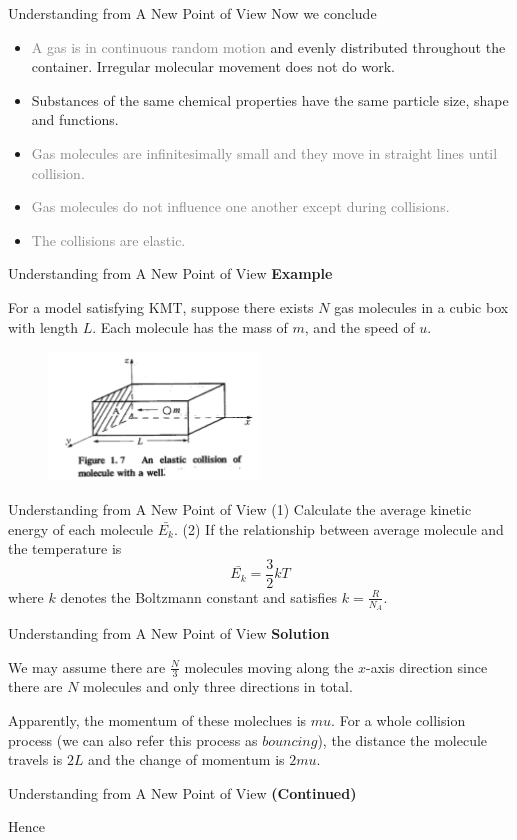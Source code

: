 \documentclass[12pt,compress]{beamer}
\begin{document}
\begin{frame}{Understanding from A New Point of View}
	Now we conclude
	\begin{itemize}
		\item \textcolor{gray}{A gas is in continuous random motion} and
			evenly distributed throughout the container. Irregular molecular 
			movement does not do work.
		\item Substances of the same chemical properties have the same particle size, 
			shape and functions.
		\item \textcolor{gray}{Gas molecules are infinitesimally small and they move in straight 
			lines until collision.}
		\item \textcolor{gray}{Gas molecules do not influence one another except 
			during collisions.}
		\item \textcolor{gray}{The collisions are elastic.}
	\end{itemize}
\end{frame}
\begin{frame}{Understanding from A New Point of View}
	\textbf{Example}
	\par For a model satisfying KMT, suppose there exists $N$ gas molecules in a cubic box with length $L$. Each molecule has the mass of $m$,
	 and the speed of $u$.	 
	\begin{figure}[!htbp]
		\centering
		\includegraphics[width=0.5\textwidth]{KMT.png}
	\end{figure}
\end{frame}
\begin{frame}{Understanding from A New Point of View}
	(1) Calculate the average kinetic energy of each molecule $\bar{E_k}$.
	(2) If the relationship between average molecule and the temperature is
		\begin{equation*}
			\bar{E_k} = \frac{3}{2}kT
		\end{equation*}
		where $k$ denotes the Boltzmann constant and satisfies $k = \frac{R}{N_A}$.
\end{frame}
\begin{frame}{Understanding from A New Point of View}
	\textbf{Solution}
	\par We may assume there are $\frac{N}{3}$ molecules moving along the $x$-axis direction
	since there are $N$ molecules and only three directions in total. 
	\par Apparently, the momentum of these moleclues is $mu$. For a whole collision process 
	(we can also refer this process as $bouncing$), the distance the molecule travels is $2L$
	and the change of momentum is $2mu$.
\end{frame}
\begin{frame}{Understanding from A New Point of View}
	\textbf{(Continued)}
	\par Hence 
\end{frame}
\end{document}
